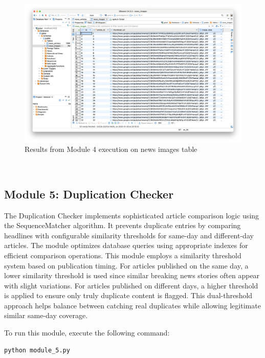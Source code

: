 \documentclass{article}
\begin{document}
\begin{figure}[H]
    \centering
    \includegraphics[width=\textwidth]{report/module_4 news_images.png}
    \caption{Results from Module 4 execution on news images table}
    \label{fig:module4-results-2}
\end{figure}

\\

\subsection{Module 5: Duplication Checker}
The Duplication Checker implements sophisticated article comparison logic using the SequenceMatcher algorithm. It prevents duplicate entries by comparing headlines with configurable similarity thresholds for same-day and different-day articles. The module optimizes database queries using appropriate indexes for efficient comparison operations.
This module employs a similarity threshold system based on publication timing. For articles published on the same day, a lower similarity threshold is used since similar breaking news stories often appear with slight variations. For articles published on different days, a higher threshold is applied to ensure only truly duplicate content is flagged. This dual-threshold approach helps balance between catching real duplicates while allowing legitimate similar same-day coverage.

To run this module, execute the following command:
\begin{lstlisting}[language=bash]
python module_5.py 
\end{lstlisting}
\end{document}
